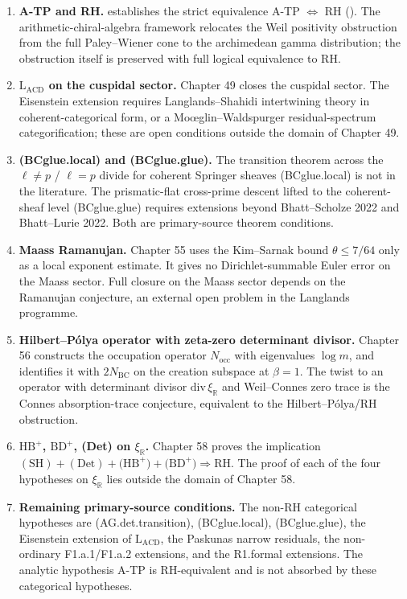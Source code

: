 \begin{enumerate}
\item \textbf{A-TP and RH.}
 establishes the
strict equivalence A-TP \(\Leftrightarrow\) RH
(). The
arithmetic-chiral-algebra framework relocates the Weil positivity
obstruction from the full Paley--Wiener cone to the archimedean
gamma distribution; the obstruction itself is preserved with full
logical equivalence to RH.
\item \textbf{\(\mathrm{L}_{\mathrm{ACD}}\) on the cuspidal sector.}
Chapter 49 closes the cuspidal sector. The Eisenstein extension
requires Langlands--Shahidi intertwining theory in coherent-categorical
form, or a Mo{\oe}glin--Waldspurger residual-spectrum
categorification; these are open conditions outside the domain of
Chapter 49.
\item \textbf{(BCglue.local) and (BCglue.glue).}
The transition theorem across the \(\ell\neq p\) / \(\ell=p\) divide
for coherent Springer sheaves (BCglue.local) is not in the literature.
The prismatic-flat cross-prime descent lifted to the coherent-sheaf
level (BCglue.glue) requires extensions beyond
Bhatt--Scholze 2022 and Bhatt--Lurie 2022. Both are primary-source
theorem conditions.
\item \textbf{Maass Ramanujan.}
Chapter 55 uses the Kim--Sarnak bound \(\theta \leq 7/64\) only as a
local exponent estimate. It gives no Dirichlet-summable Euler error on
the Maass sector. Full closure on the Maass sector depends on the
Ramanujan conjecture, an external open problem in the Langlands
programme.
\item \textbf{Hilbert--P\'{o}lya operator with zeta-zero determinant divisor.}
Chapter 56 constructs the occupation operator \(N_{\mathrm{occ}}\)
with eigenvalues \(\log m\), and identifies it with
\(2N_{\mathrm{BC}}\) on the creation subspace at \(\beta=1\).
The twist to an operator with determinant divisor
\(\mathrm{div}\,\xi_{\mathbb R}\) and Weil--Connes zero trace is the
Connes absorption-trace conjecture, equivalent to the
Hilbert--P\'olya/RH obstruction.
\item \textbf{\(\mathrm{HB}^{+}\), \(\mathrm{BD}^{+}\), (Det) on \(\xi_{\mathbb{R}}\).}
Chapter 58 proves the implication
\(\mathrm{(SH)}+\mathrm{(Det)}+\mathrm{(HB}^{+})+\mathrm{(BD}^{+})
\Rightarrow \mathrm{RH}\). The proof of each of the four hypotheses on
\(\xi_{\mathbb{R}}\) lies outside the domain of Chapter 58.
\item \textbf{Remaining primary-source conditions.}
The non-RH categorical hypotheses are (AG.det.transition),
(BCglue.local), (BCglue.glue), the Eisenstein extension of
\(\mathrm{L}_{\mathrm{ACD}}\), the Paskunas narrow residuals, the
non-ordinary F1.a.1/F1.a.2 extensions, and the R1.formal extensions.
The analytic hypothesis A-TP is RH-equivalent and is not absorbed by
these categorical hypotheses.
\end{enumerate}

